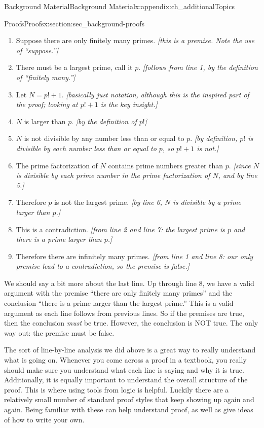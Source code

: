 \documentclass[oneside,10pt,]{book}
\numberwithin{equation}{chapter}
\begin{document}
\begin{appendixptx}{Background Material}{}{Background Material}{}{}{x:appendix:ch_additionalTopics}
\begin{sectionptx}{Proofs}{}{Proofs}{}{}{x:section:sec_background-proofs}
\begin{introduction}{}
\par
%
\begin{enumerate}
\item{}Suppose there are only finitely many primes. \emph{[this is a premise.  Note the use of ``suppose.'']}%
\item{}There must be a largest prime, call it \(p\). \emph{[follows from line 1, by the definition of ``finitely many.'']}%
\item{}Let \(N = p! + 1\). \emph{[basically just notation, although this is the inspired part of the proof; looking at \(p! + 1\) is the key insight.]}%
\item{}\(N\) is larger than \(p\). \emph{[by the definition of \(p!\)]}%
\item{}\(N\) is not divisible by any number less than or equal to \(p\). \emph{[by definition, \(p!\) is divisible by each number less than or equal to \(p\), so \(p! + 1\) is not.]}%
\item{}The prime factorization of \(N\) contains prime numbers greater than \(p\). \emph{[since \(N\) is divisible by each prime number in the prime factorization of \(N\), and by line 5.]}%
\item{}Therefore \(p\) is not the largest prime. \emph{[by line 6, \(N\) is divisible by a prime larger than \(p\).]}%
\item{}This is a contradiction. \emph{[from line 2 and line 7: the largest prime is \(p\) and there is a prime larger than \(p\).]}%
\item{}Therefore there are infinitely many primes. \emph{[from line 1 and line 8: our only premise lead to a contradiction, so the premise is false.]}%
\end{enumerate}
%
\par
We should say a bit more about the last line. Up through line 8, we have a valid argument with the premise ``there are only finitely many primes'' and the conclusion ``there is a prime larger than the largest prime.'' This is a valid argument as each line follows from previous lines. So if the premises are true, then the conclusion \emph{must} be true. However, the conclusion is NOT true. The only way out: the premise must be false.%
\par
The sort of line-by-line analysis we did above is a great way to really understand what is going on. Whenever you come across a proof in a textbook, you really should make sure you understand what each line is saying and why it is true. Additionally, it is equally important to understand the overall structure of the proof. This is where using tools from logic is helpful. Luckily there are a relatively small number of standard proof styles that keep showing up again and again. Being familiar with these can help understand proof, as well as give ideas of how to write your own.%

\end{introduction}
\end{sectionptx}
\end{appendixptx}
\end{document}
